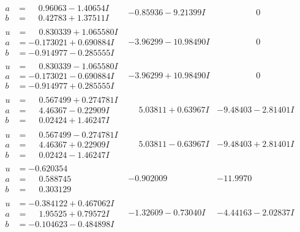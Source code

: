 \documentclass[1p]{elsarticle_modified}
\theoremstyle{definition}
\begin{document}
$$\begin{array}{c|c|c}
\begin{aligned}
a &= \phantom{-}0.96063 - 1.40654 I \\
b &= \phantom{-}0.42783 + 1.37511 I\end{aligned}
 & -0.85936 - 9.21399 I & \phantom{-0.000000 } 0 \\ \hline\begin{aligned}
u &= \phantom{-}0.830339 + 1.065580 I \\
a &= -0.173021 + 0.690884 I \\
b &= -0.914977 - 0.285555 I\end{aligned}
 & -3.96299 - 10.98490 I & \phantom{-0.000000 } 0 \\ \hline\begin{aligned}
u &= \phantom{-}0.830339 - 1.065580 I \\
a &= -0.173021 - 0.690884 I \\
b &= -0.914977 + 0.285555 I\end{aligned}
 & -3.96299 + 10.98490 I & \phantom{-0.000000 } 0 \\ \hline\begin{aligned}
u &= \phantom{-}0.567499 + 0.274781 I \\
a &= \phantom{-}4.46367 - 0.22909 I \\
b &= \phantom{-}0.02424 + 1.46247 I\end{aligned}
 & \phantom{-}5.03811 + 0.63967 I & -9.48403 - 2.81401 I \\ \hline\begin{aligned}
u &= \phantom{-}0.567499 - 0.274781 I \\
a &= \phantom{-}4.46367 + 0.22909 I \\
b &= \phantom{-}0.02424 - 1.46247 I\end{aligned}
 & \phantom{-}5.03811 - 0.63967 I & -9.48403 + 2.81401 I \\ \hline\begin{aligned}
u &= -0.620354\phantom{ +0.000000I} \\
a &= \phantom{-}0.588745\phantom{ +0.000000I} \\
b &= \phantom{-}0.303129\phantom{ +0.000000I}\end{aligned}
 & -0.902009\phantom{ +0.000000I} & -11.9970\phantom{ +0.000000I} \\ \hline\begin{aligned}
u &= -0.384122 + 0.467062 I \\
a &= \phantom{-}1.95525 + 0.79572 I \\
b &= -0.104623 - 0.484898 I\end{aligned}
 & -1.32609 - 0.73040 I & -4.44163 - 2.02837 I\\

\end{array}$$
\end{document}
